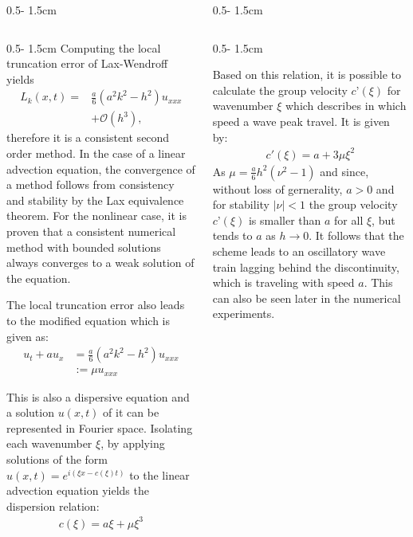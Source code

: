 \documentclass{uibposter}
\begin{document}
\begin{frame}[fragile]
\begin{columns}
\begin{column}{0.5\textwidth - 1.5cm}
\begin{column}{0.5\textwidth - 1.5cm}
\vspace{0.5cm}
Computing the local truncation error of Lax-Wendroff yields
\begin{align*}
L_k(x, t) = &\frac{a}{6}(a^2 k^2 - h^2)u_{xxx} \\
&+ \mathcal{O}(h^3) \text{,}
\end{align*}
therefore it is a consistent second order method. 
In the case of a linear advection equation, the convergence of a method follows from consistency and stability by the Lax equivalence theorem. For the nonlinear case, it is proven that a consistent numerical method with bounded solutions always converges to a weak solution of the equation.

\vspace{0.5cm}
The local truncation error also leads to the modified equation which is given as:
\begin{align*}
u_t + a u_x &= \frac{a}{6} (a^2 k^2 - h^2) u_{xxx}\\
&:= \mu u_{xxx}
\end{align*}

This is also a dispersive equation and a solution $u(x, t)$ of it can be represented in Fourier space. Isolating each wavenumber $\xi$, by applying solutions of the form $u(x,t) = e^{i(\xi x - c(\xi)t)}$ to the linear advection equation yields the dispersion relation:
\begin{align*}
c(\xi) = a\xi + \mu \xi^3
\end{align*}

    \end{column}
\end{column}
\begin{column}{0.5\textwidth - 1.5cm}
\begin{column}{0.5\textwidth - 1.5cm}
\vspace*{-1.7cm}

Based on this relation, it is possible to calculate the group velocity $c’(\xi)$ for wavenumber $\xi$ which describes in which speed a wave peak travel. It is given by:
\begin{align*}
c'(\xi) = a + 3\mu \xi^2
\end{align*}
As $\mu = \frac{a}{6}h^2(\nu^2 - 1)$ and since, without loss of gernerality, $a > 0$ and for stability $|\nu| < 1$ the group velocity $c’(\xi)$ is smaller than $a$ for all $\xi$, but tends to $a$ as $h\rightarrow0$. It follows that the scheme leads to an oscillatory wave train lagging behind the discontinuity, which is traveling with speed $a$. This can also be seen later in the numerical experiments.
    

\end{column}
\end{column}
\end{columns}
\end{frame}
\end{document}
